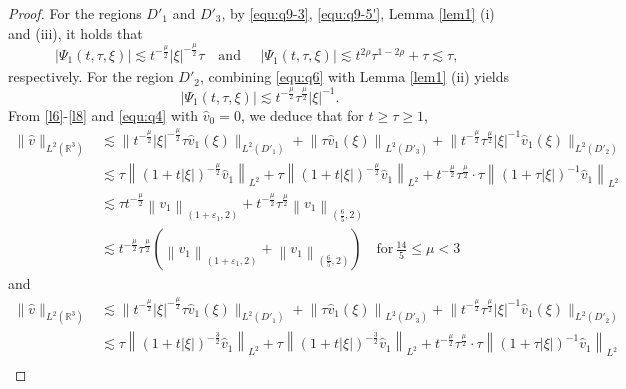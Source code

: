 \documentclass[11pt,twoside]{article}
\newcommand{\R}{\mathbb R}
\newcommand{\f}{\frac}
\theoremstyle{plain}
\theoremstyle{definition}
\theoremstyle{remark}
\numberwithin{equation}{section}
\begin{document}
\begin{proof}
For the regions $D'_1$ and $D'_3$, by \eqref{equ:q9-3}, \eqref{equ:q9-5'}, Lemma \ref{lem1} (i) and (iii), it holds
that
\begin{equation}\label{l6}
\left|\Psi_1(t, \tau, \xi)\right|  \lesssim t^{-\frac{\mu}{2}}|\xi|^{-\frac{\mu}{2}}\tau
\quad\text{and}\quad
\begin{aligned}
\left|\Psi_1(t, \tau, \xi)\right|  \lesssim t^{2\rho}\tau^{1-2\rho}+\tau\lesssim \tau,
\end{aligned}
\end{equation}
respectively. For the region $D'_2$, combining \eqref{equ:q6} with Lemma \ref{lem1} (ii) yields
\begin{equation}\label{l8}
 \left|\Psi_1(t, \tau, \xi)\right|  \lesssim t^{-\frac{\mu}{2}}\tau^{\frac{\mu}{2}}|\xi|^{-1}.
\end{equation}
From \eqref{l6}-\eqref{l8} and \eqref{equ:q4} with $\hat{v}_0 = 0$, we deduce that for  $t\geq \tau\geq1$,
\begin{equation}\label{l9'}
\begin{aligned}
\|\hat{v}\|_{L^2(\R^3)} & \lesssim\big\|t^{-\frac{\mu}{2}} |\xi|^{-\frac{\mu}{2}}\tau \hat{v}_1(\xi)\big\|_{L^2(D'_1)}+\left\|\tau \hat{v}_1(\xi)\right\|_{L^2(D'_3)} +\big\|t^{-\frac{\mu}{2}}\tau^{\frac{\mu}{2}} |\xi|^{-1} \hat{v}_1(\xi)\big\|_{L^2(D'_2)} \\
& \lesssim \tau\left\|(1+t|\xi|)^{-\f{\mu}{2}} \hat{v}_1\right\|_{L^2}+\tau\left\|(1+t|\xi|)^{-\f{\mu}{2}} \hat{v}_1\right\|_{L^2}+t^{-\frac{\mu}{2}} \tau^{\frac{\mu}{2}} \cdot \tau\left\|(1+\tau|\xi|)^{-1} \hat{v}_1\right\|_{L^2} \\
& \lesssim \tau t^{-\f{\mu}{2}}\left\|v_1\right\|_{\left(1+\varepsilon_1, 2\right)}+t^{-\f{\mu}{2}} \tau^{\f{\mu}{2}}\left\|v_1\right\|_{\left(\f65, 2\right)} \\
& \lesssim  t^{-\f{\mu}{2}} \tau^{\f{\mu}{2}}(\left\|v_1\right\|_{\left(1+\varepsilon_1, 2\right)}+\left\|v_1\right\|_{\left(\f65, 2\right)})\quad\text{for}\,\f{14}{5}\leq\mu<3
\end{aligned}
\end{equation}
and
\begin{equation}\label{l9}
\begin{aligned}
\|\hat{v}\|_{L^2(\R^3)} & \lesssim\big\|t^{-\frac{\mu}{2}} |\xi|^{-\frac{\mu}{2}}\tau \hat{v}_1(\xi)\big\|_{L^2(D'_1)}+\left\|\tau \hat{v}_1(\xi)\right\|_{L^2(D'_3)} +\big\|t^{-\frac{\mu}{2}}\tau^{\frac{\mu}{2}} |\xi|^{-1} \hat{v}_1(\xi)\big\|_{L^2(D'_2)} \\
& \lesssim \tau\left\|(1+t|\xi|)^{-\f32} \hat{v}_1\right\|_{L^2}+\tau\left\|(1+t|\xi|)^{-\f32} \hat{v}_1\right\|_{L^2}+t^{-\frac{\mu}{2}} \tau^{\frac{\mu}{2}} \cdot \tau\left\|(1+\tau|\xi|)^{-1} \hat{v}_1\right\|_{L^2} \\

\end{aligned}
\end{equation}
\end{proof}
\end{document}
